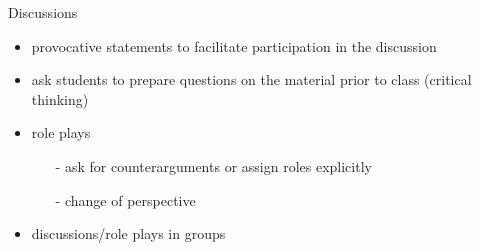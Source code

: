 \begin{frame}{Discussions}
	\pause
	\begin{itemize}[<+->]
		\item provocative statements to \alert{facilitate participation} in the discussion
		\item ask students to prepare questions on the material prior to class	(\alert{critical thinking})	
		\item {role plays}
		\begin{itemize}
			\item[-] ask for counterarguments  or assign roles explicitly
			\item[-] \alert{change of perspective}
		\end{itemize}
		\item discussions/role plays in \alert{groups}
	\end{itemize}
\end{frame}


